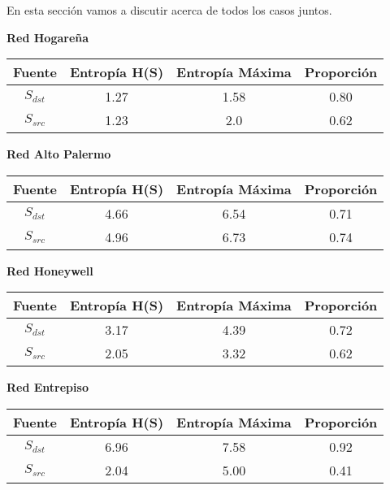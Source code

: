 En esta sección vamos a discutir acerca de todos los casos juntos.


\begin{center}
\textbf{Red Hogareña}

\begin{tabular}{|c|c|c|c|}
\hline
Fuente&Entropía H(S)&Entropía Máxima&Proporción\\
\hline
$S_{dst}$&1.27&1.58&0.80\\
$S_{src}$&1.23&2.0&0.62\\ 
\hline
\end{tabular}
\end{center}

\begin{center}
\textbf{Red Alto Palermo}

\begin{tabular}{|c|c|c|c|}
\hline
Fuente&Entropía H(S)&Entropía Máxima&Proporción\\
\hline
$S_{dst}$&4.66&6.54&0.71\\
$S_{src}$&4.96&6.73&0.74\\ 
\hline
\end{tabular}
\end{center}

\begin{center}
\textbf{Red Honeywell}

\begin{tabular}{|c|c|c|c|}
\hline
Fuente&Entropía H(S)&Entropía Máxima&Proporción\\
\hline
$S_{dst}$&3.17&4.39&0.72\\
$S_{src}$&2.05&3.32&0.62\\ 
\hline
\end{tabular}
\end{center}

\begin{center}
\textbf{Red Entrepiso}
 
  \begin{tabular}{|c|c|c|c|}
  \hline
  Fuente&Entropía H(S)&Entropía Máxima&Proporción\\
  \hline
  $S_{dst}$&6.96&7.58&0.92\\
  $S_{src}$&2.04&5.00&0.41\\ 
  \hline
  \end{tabular}
\end{center}